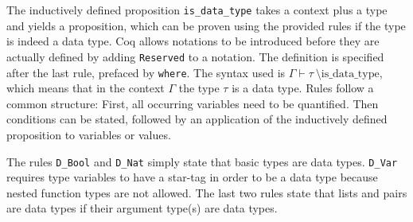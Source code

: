\documentclass[paper = a4, fleqn, twoside]{scrreprt}
\newcommand{\coqinline}[1]{\texttt{#1}}
\begin{document}
The inductively defined proposition \coqinline{is_data_type} takes a context plus a type and yields a proposition, which can be proven using the provided rules if the type is indeed a data type. Coq allows notations to be introduced before they are actually defined by adding \coqinline{Reserved} to a notation. The definition is specified after the last rule, prefaced by \coqinline{where}. The syntax used is $\Gamma \vdash \tau \: \text{\textbackslash is\_data\_type}$, which means that in the context $\Gamma$ the type $\tau$ is a data type. Rules follow a common structure: First, all occurring variables need to be quantified. Then conditions can be stated, followed by an application of the inductively defined proposition to variables or values.
\par
The rules \coqinline{D_Bool} and \coqinline{D_Nat} simply state that basic types are data types. \coqinline{D_Var} requires type variables to have a star-tag in order to be a data type because nested function types are not allowed.  The last two rules state that lists and pairs are data types if their argument type(s) are data types. 
\par
\end{document}
